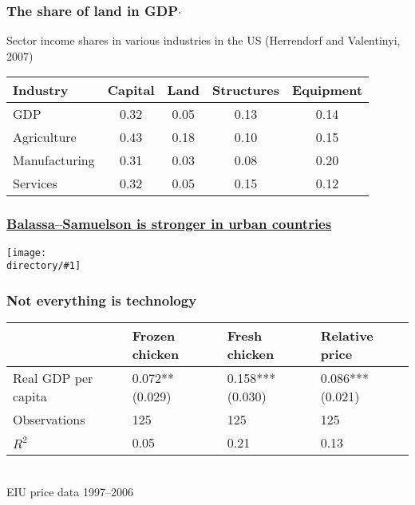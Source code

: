 \documentclass[compress,mathserif]{beamer}
\newcounter{perc}
\newcounter{percek}
\newcommand{\directory}{figures}
\newcommand{\widefigure}[2]{\begin{frame}\frametitle{\hyperlink{#1back}{#2}}\hypertarget{#1}{{\begin{center}\texttt{[image: \\directory/\#1]}\end{center}}}\end{frame}}
\renewcommand{\time}[1]{\addtocounter{percek}{#1}}
\begin{document}
\begin{frame}\frametitle{The share of land in GDP$\cdot$}
Sector income shares in various industries in the US (Herrendorf and Valentinyi, 2007)
\begin{center}
\begin{tabular}{l|c|ccc}
\hline\hline
Industry    & Capital   &   Land    & Structures    & Equipment \\ \hline
GDP         &   0.32    &   0.05    & 0.13          & 0.14      \\ \hline
Agriculture & 0.43      &   0.18    & 0.10          & 0.15      \\
Manufacturing & 0.31    &   0.03    & 0.08          & 0.20      \\
Services    & 0.32      & 0.05      & 0.15          & 0.12      \\ \hline\hline
\end{tabular}
\end{center}
\end{frame}

\widefigure{sc_penn}{Balassa--Samuelson is stronger in urban countries}

\time{2}

\begin{frame}\frametitle{Not everything is technology}
\begin{center}
\begin{tabular}{lm{5em}m{5em}m{5em}}
  \hline
   & Frozen chicken & Fresh chicken & Relative price\\
   \hline
  Real GDP per capita & 0.072**   (0.029) & 0.158***   (0.030) & 0.086***   (0.021)\\
\hline
  Observations &  125 & 125 & 125 
\\
  $R^2$ &  0.05& 0.21 & 0.13
\\
  \hline
\end{tabular}\\
{\small EIU price data 1997--2006}
\end{center}
\end{frame}

\time 2

\end{document}
